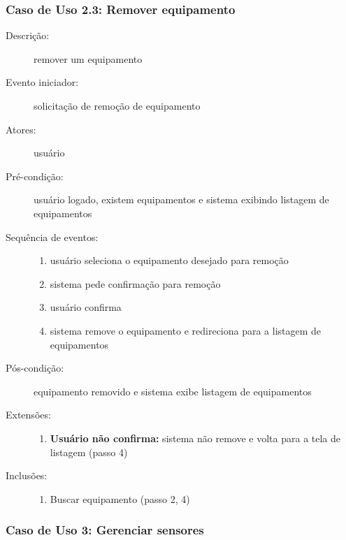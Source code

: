 \subsubsection{Caso de Uso 2.3: Remover equipamento}
\begin{description}
	\item[Descrição:] remover um equipamento
	\item[Evento iniciador:] solicitação de remoção de equipamento
	\item[Atores:] usuário
	\item[Pré-condição:] usuário logado, existem equipamentos e sistema exibindo listagem de equipamentos
	\item[Sequência de eventos:] \hfill
		\begin{enumerate}
			\item{usuário seleciona o equipamento desejado para remoção}
			\item{sistema pede confirmação para remoção}
			\item{usuário confirma}
			\item{sistema remove o equipamento e redireciona para a listagem de equipamentos}
		\end{enumerate}
	\item[Pós-condição:] equipamento removido e sistema exibe listagem de equipamentos
	\item[Extensões:] \hfill
		\begin{enumerate}
			\item{\textbf{Usuário não confirma:} sistema não remove e volta para a tela de listagem (passo 4)}
		\end{enumerate}
	\item[Inclusões:] \hfill
		\begin{enumerate}
			\item{Buscar equipamento (passo 2, 4)}
		\end{enumerate}
\end{description}
\subsubsection{Caso de Uso 3: Gerenciar sensores}

